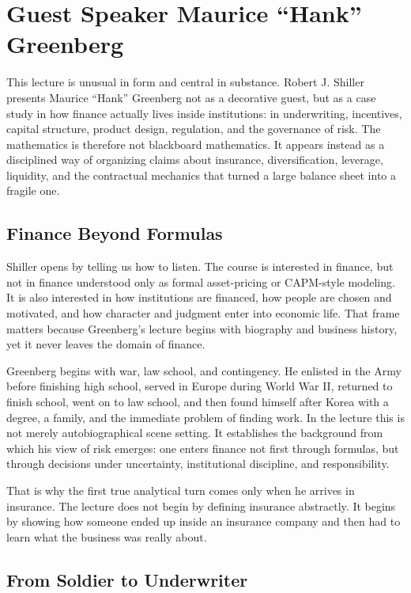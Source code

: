 \chapter{Guest Speaker Maurice ``Hank'' Greenberg}

This lecture is unusual in form and central in substance. Robert J. Shiller presents Maurice ``Hank'' Greenberg not as a decorative guest, but as a case study in how finance actually lives inside institutions: in underwriting, incentives, capital structure, product design, regulation, and the governance of risk. The mathematics is therefore not blackboard mathematics. It appears instead as a disciplined way of organizing claims about insurance, diversification, leverage, liquidity, and the contractual mechanics that turned a large balance sheet into a fragile one.

\section{Finance Beyond Formulas}

Shiller opens by telling us how to listen. The course is interested in finance, but not in finance understood only as formal asset-pricing or CAPM-style modeling. It is also interested in how institutions are financed, how people are chosen and motivated, and how character and judgment enter into economic life. That frame matters because Greenberg's lecture begins with biography and business history, yet it never leaves the domain of finance.

Greenberg begins with war, law school, and contingency. He enlisted in the Army before finishing high school, served in Europe during World War II, returned to finish school, went on to law school, and then found himself after Korea with a degree, a family, and the immediate problem of finding work. In the lecture this is not merely autobiographical scene setting. It establishes the background from which his view of risk emerges: one enters finance not first through formulas, but through decisions under uncertainty, institutional discipline, and responsibility.

That is why the first true analytical turn comes only when he arrives in insurance. The lecture does not begin by defining insurance abstractly. It begins by showing how someone ended up inside an insurance company and then had to learn what the business was really about.

\section{From Soldier to Underwriter}

